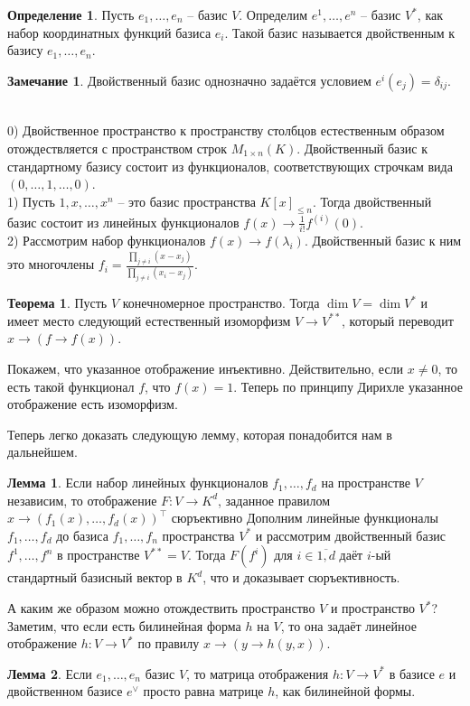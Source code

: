 \documentclass[10pt,a4paper,oneside]{book} %
\theoremstyle{definition}
\newtheorem*{rem}{Замечание}
\newtheorem*{defn}{Определение}
\newtheorem{thm}{Теорема}
\newtheorem{lem}{Лемма}
\newcommand{\ovl}{\overline}
\def\exm{\noindent {\bf Примеры:}}
\def\thrm{\begin{thm}}
\def\ethrm{\end{thm}}
\def\dfn{\begin{defn}}
\def\edfn{\end{defn}}
\def\lm{\begin{lem}}
\def\elm{\end{lem}}
\def\rm{\begin{rem}}
\def\erm{\end{rem}}
\begin{document}
\dfn Пусть $e_1,\dots,e_n$ -- базис $V$. Определим $e^1,\dots, e^n$ -- базис $V^*$, как набор координатных функций базиса $e_i$. Такой базис называется двойственным к базису $e_1,\dots,e_n$. 
\edfn

\rm Двойственный базис однозначно задаётся условием $e^i(e_j)=\delta_{ij}$.
\erm

\exm\\
0) Двойственное пространство к пространству столбцов естественным образом отождествляется с пространством строк $M_{1\times n}(K)$. Двойственный базис к стандартному базису состоит из функционалов, соответствующих строчкам вида $(0,\dots, 1, \dots, 0)$.\\ 
1) Пусть $1,x,\dots, x^n$ -- это базис пространства $K[x]_{\leq n}$. Тогда двойственный базис состоит из линейных функционалов $f(x)\to \frac{1}{i!}f^{(i)}(0)$.\\
2) Рассмотрим набор функционалов $f(x)\to f(\lambda_i)$. Двойственный базис к ним это многочлены $f_i=\frac{\prod_{j\neq i} (x-x_j)}{\prod_{j\neq i}{(x_i-x_j)}}$.




\thrm Пусть $V$ конечномерное пространство. Тогда $\dim V = \dim V^* $ и имеет место следующий естественный изоморфизм $V \to V^{**} $, который переводит $x \to (f\to f(x))$.
\ethrm
\proof Покажем, что указанное отображение инъективно. Действительно, если $x\neq 0$, то есть такой функционал $f$, что $f(x)=1$. 
Теперь по принципу Дирихле указанное отображение есть изоморфизм.
\endproof


Теперь легко доказать следующую лемму, которая понадобится нам в дальнейшем.

\lm Если набор линейных функционалов $f_1,\dots,f_d$ на пространстве $V$  независим, то отображение $F\colon V\to K^d$, заданное правилом $x \to (f_1(x),\dots, f_d(x))^{\top}$ сюръективно
\proof Дополним линейные функционалы $f_1,\dots,f_d$ до базиса $f_1,\dots,f_n$ пространства $V^*$ и рассмотрим двойственный базис $f^1,\dots,f^n$ в пространстве $V^{**}=V$. Тогда $F(f^i)$ для $i\in\ovl{1,d}$ даёт $i$-ый стандартный базисный вектор в $K^d$, что и доказывает сюръективность.
\endproof
\elm


А каким же образом можно отождествить пространство $V$ и пространство $V^*$?
Заметим, что если есть билинейная форма $h$ на $V$, то она задаёт линейное отображение $h\colon V \to V^*$ по правилу $x \to (y \to h(y,x))$. 

\lm Если $e_1,\dots, e_n$ базис $V$, то матрица отображения $h\colon V \to V^*$ в базисе $e$ и двойственном базисе $e^{\vee}$ просто равна матрице $h$, как билинейной формы.
\elm
\end{document}
